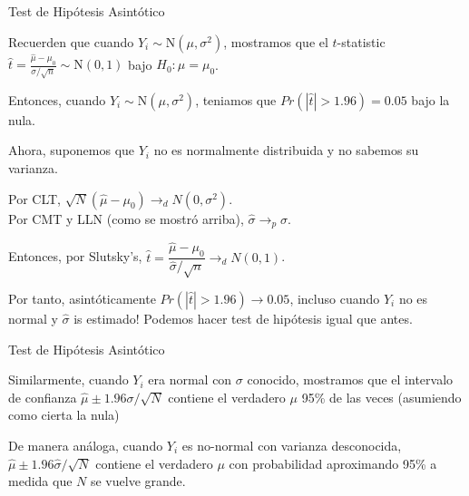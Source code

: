 \documentclass[11pt,handout,aspectratio=169]{beamer}
\newenvironment{wideitemize}{\itemize\addtolength{\itemsep}{10pt}}{\enditemize}
\begin{document}
\begin{frame}{Test de Hipótesis Asintótico}

\begin{wideitemize}
\item
Recuerden que cuando $Y_i \sim \mathrm{N}(\mu,\sigma^2)$, mostramos que el $t$-statistic $\hat{t} = \frac{\hat\mu - \mu_0}{\sigma / \sqrt{n}} \sim  \mathrm{N}(0,1)$ bajo $H_0: \mu = \mu_0$.

\pause
\item 
Entonces, cuando $Y_i \sim \mathrm{N}(\mu,\sigma^2)$, teniamos que $Pr(|\hat t| > 1.96) = 0.05$ bajo la nula.

\pause
\item
Ahora, suponemos que $Y_i$ no es normalmente distribuida y no sabemos su varianza.

\pause
\item
Por CLT, $\sqrt{N} (\hat\mu - \mu_0) \rightarrow_d N(0,\sigma^2)$.\\
Por CMT y LLN (como se mostró arriba), $\hat\sigma \rightarrow_p \sigma$. 

\pause
\item
Entonces, por Slutsky's, $\hat{t} = \dfrac{\hat\mu - \mu_0}{ \hat\sigma /\sqrt{n} } \rightarrow_d N(0,1)$.

\pause
\item
Por tanto, asintóticamente $Pr( |\hat{t}| > 1.96 ) \rightarrow 0.05$, incluso cuando $Y_i$  no es normal y $\hat\sigma$ is estimado! Podemos hacer test de hipótesis igual que antes.

\end{wideitemize}	
	
\end{frame}


\begin{frame}{Test de Hipótesis Asintótico}

\begin{wideitemize}
\item
Similarmente, cuando $Y_i$ era normal con $\sigma$ conocido, mostramos que el intervalo de confianza $\hat\mu \pm 1.96 \sigma/\sqrt{N}$ contiene el verdadero $\mu$ 95\% de las veces (asumiendo como cierta la nula)

\pause
\item
De manera análoga, cuando $Y_i$ es no-normal con varianza desconocida, $\hat\mu \pm 1.96 \hat\sigma/\sqrt{N}$ contiene el verdadero $\mu$ con probabilidad aproximando 95\% a medida que $N$ se vuelve grande.

\end{wideitemize}
	
\end{frame}
\end{document}
